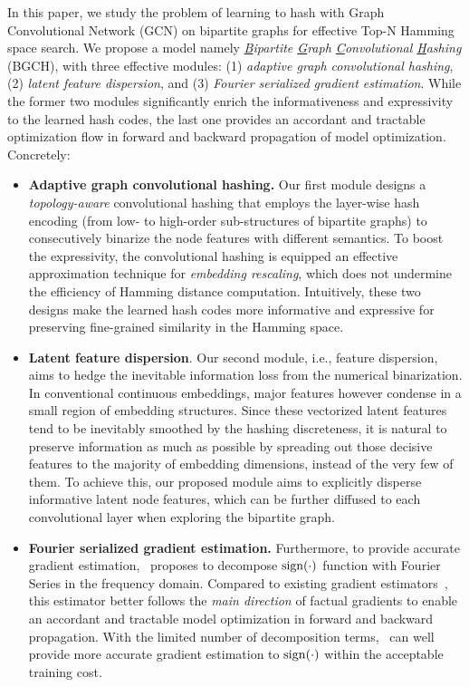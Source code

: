 In this paper, we study the problem of learning to hash with Graph Convolutional Network (GCN) on bipartite graphs for effective Top-N Hamming space search.
We propose a model namely \textit{\underline{B}ipartite \underline{G}raph \underline{C}onvolutional \underline{H}ashing} (BGCH), with three effective modules: (1) \textit{adaptive graph convolutional hashing}, (2) \textit{latent feature dispersion}, and (3) \textit{Fourier serialized gradient estimation}.
While the former two modules significantly enrich the informativeness and expressivity to the learned hash codes, the last one provides an accordant and tractable optimization flow in forward and backward propagation of model optimization.
Concretely:
\begin{itemize}[leftmargin=*]
\item \textbf{Adaptive graph convolutional hashing.}
Our first module designs a \textit{topology-aware} convolutional hashing that employs the layer-wise hash encoding (from low- to high-order sub-structures of bipartite graphs) to consecutively binarize the node features with different semantics.
To boost the expressivity, the convolutional hashing is equipped an effective approximation technique for \textit{embedding rescaling}, which does not undermine the efficiency of Hamming distance computation.
Intuitively, these two designs make the learned hash codes more informative and expressive for preserving fine-grained similarity in the Hamming space.

\item \textbf{Latent feature dispersion}.
Our second module, i.e., feature dispersion, aims to hedge the inevitable information loss from the numerical binarization.
In conventional continuous embeddings, major features however condense in a small region of embedding structures.
Since these vectorized latent features tend to be inevitably smoothed by the hashing discreteness, it is natural to preserve information as much as possible by spreading out those decisive features to the majority of embedding dimensions, instead of the very few of them.
To achieve this, our proposed module aims to explicitly disperse informative latent node features, which can be further diffused to each convolutional layer when exploring the bipartite graph.



\item \textbf{Fourier serialized gradient estimation.}
Furthermore, to provide accurate gradient estimation, \model~proposes to decompose $\operatorname{sign}(\cdot)$ function with Fourier Series in the frequency domain.
Compared to existing gradient estimators~\cite{qin2020forward,gong2019differentiable,darabi2018bnn,sigmoid,RBCN}, this estimator better follows the \textit{main direction} of factual gradients to enable an accordant and tractable model optimization in forward and backward propagation.
With the limited number of decomposition terms, \model~can well provide more accurate gradient estimation to $\operatorname{sign}(\cdot)$ within the acceptable training cost.
\end{itemize}

